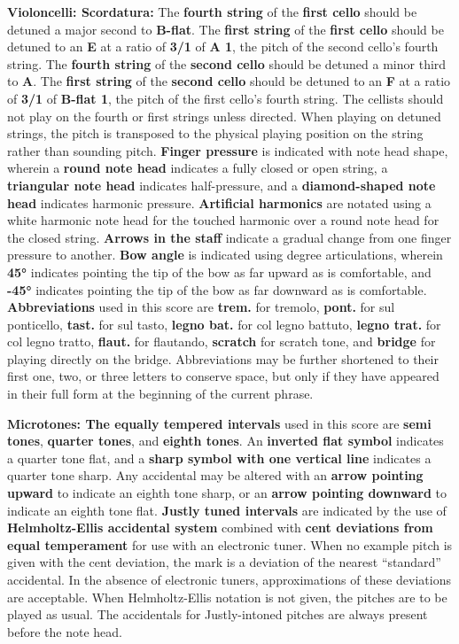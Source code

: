 \documentclass[12pt]{article}
\newcommand*\circled[1]{\tikz[baseline=(char.base)]{
            \node[shape=circle,draw,inner sep=1pt] (char) {#1};}}
\begin{document}
\begingroup
\textbf{Violoncelli: \circled{1} Scordatura:} The \textbf{fourth string} of the \textbf{first cello} should be detuned a major second to \textbf{B-flat}. The \textbf{first string} of the \textbf{first cello} should be detuned to an \textbf{E} at a ratio of \textbf{3/1} of \textbf{A 1}, the pitch of the second cello's fourth string. The \textbf{fourth string} of the \textbf{second cello} should be detuned a minor third to \textbf{A}. The \textbf{first string} of the \textbf{second cello} should be detuned to an \textbf{F} at a ratio of \textbf{3/1} of \textbf{B-flat 1}, the pitch of the first cello's fourth string. The cellists should not play on the fourth or first strings unless directed. When playing on detuned strings, the pitch is transposed to the physical playing position on the string rather than sounding pitch. \textbf{\circled{2} Finger pressure} is indicated with note head shape, wherein a \textbf{round note head} indicates a fully closed or open string, a \textbf{triangular note head} indicates half-pressure, and a \textbf{diamond-shaped note head} indicates harmonic pressure. \textbf{\circled{3} Artificial harmonics} are notated using a white harmonic note head for the touched harmonic over a round note head for the closed string. \textbf{\circled{4} Arrows in the staff} indicate a gradual change from one finger pressure to another. \textbf{\circled{5} Bow angle} is indicated using degree articulations, wherein \textbf{45°} indicates pointing the tip of the bow as far upward as is comfortable, and \textbf{-45°} indicates pointing the tip of the bow as far downward as is comfortable. \textbf{\circled{6} Abbreviations} used in this score are \textbf{trem.} for tremolo, \textbf{pont.} for sul ponticello, \textbf{tast.} for sul tasto,  \textbf{legno bat.} for col legno battuto, \textbf{legno trat.} for col legno tratto, \textbf{flaut.} for flautando, \textbf{scratch} for scratch tone, and \textbf{bridge} for playing directly on the bridge. Abbreviations may be further shortened to their first one, two, or three letters to conserve space, but only if they have appeared in their full form at the beginning of the current phrase. 
\endgroup

\begingroup
\textbf{Microtones: \circled{1} The equally tempered intervals} used in this score are \textbf{semi tones}, \textbf{quarter tones}, and \textbf{eighth tones}. An \textbf{inverted flat symbol} indicates a quarter tone flat, and a \textbf{sharp symbol with one vertical line} indicates a quarter tone sharp. Any accidental may be altered with an \textbf{arrow pointing upward} to indicate an eighth tone sharp, or an \textbf{arrow pointing downward} to indicate an eighth tone flat. \textbf{\circled{2} Justly tuned intervals} are indicated by the use of \textbf{Helmholtz-Ellis accidental system} combined with \textbf{cent deviations from equal temperament} for use with an electronic tuner. When no example pitch is given with the cent deviation, the mark is a deviation of the nearest “standard” accidental. In the absence of electronic tuners, approximations of these deviations are acceptable. When Helmholtz-Ellis notation is not given, the pitches are to be played as usual. The accidentals for Justly-intoned pitches are always present before the note head.
\endgroup
\end{document}
